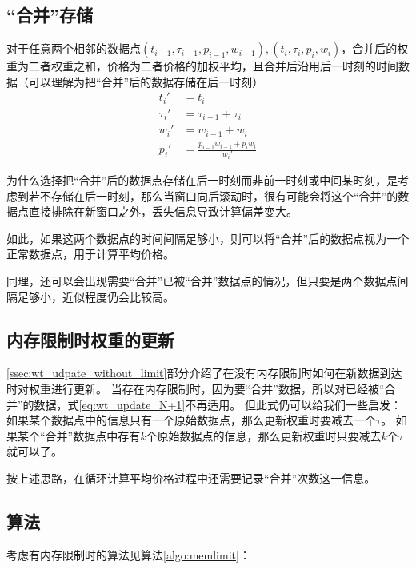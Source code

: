\documentclass[titlepage=false]{ctexart}
\begin{document}
\subsection{“合并”存储}

对于任意两个相邻的数据点$(t_{i-1},\tau_{i-1},p_{i-1},w_{i-1}),(t_{i},\tau_{i},p_{i},w_{i})$，合并后的权重为二者权重之和，价格为二者价格的加权平均，且合并后沿用后一时刻的时间数据（可以理解为把“合并”后的数据存储在后一时刻）
\begin{align}\label{eq:merge}
    t_i' &= t_i\\
    \tau_i' &= \tau_{i-1} + \tau_{i}\\
    w_i' &= w_{i-1} + w_i\\
    p_i' &= \frac{p_{i-1}w_{i-1} + p_iw_i}{w_i'}
\end{align}

为什么选择把“合并”后的数据点存储在后一时刻而非前一时刻或中间某时刻，是考虑到若不存储在后一时刻，那么当窗口向后滚动时，很有可能会将这个“合并”的数据点直接排除在新窗口之外，丢失信息导致计算偏差变大。



如此，如果这两个数据点的时间间隔足够小，则可以将“合并”后的数据点视为一个正常数据点，用于计算平均价格。

同理，还可以会出现需要“合并”已被“合并”数据点的情况，但只要是两个数据点间隔足够小，近似程度仍会比较高。



\subsection{内存限制时权重的更新}\label{ssec:wt_udpate_with_limit}

\ref{ssec:wt_udpate_without_limit}部分介绍了在没有内存限制时如何在新数据到达时对权重进行更新。
当存在内存限制时，因为要“合并”数据，所以对已经被“合并”的数据，式\eqref{eq:wt_update_N+1}不再适用。
但此式仍可以给我们一些启发：如果某个数据点中的信息只有一个原始数据点，那么更新权重时要减去一个$\tau$。
如果某个“合并”数据点中存有$k$个原始数据点的信息，那么更新权重时只要减去$k$个$\tau$就可以了。

按上述思路，在循环计算平均价格过程中还需要记录“合并”次数这一信息。

\subsection{算法}

考虑有内存限制时的算法见算法\ref{algo:memlimit}：
\end{document}
